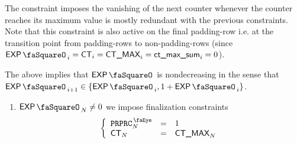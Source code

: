 \saNote{} The constraint imposes the vanishing of the next counter whenever the counter reaches its maximum value is mostly redundant with the previous constraints.
Note that this constraint is also active on the final padding-row i.e. at the transition point from padding-rows to non-padding-rows (since $\expStamp_{i} = \ct_{i} = \maxCt_{i} = \maxCtFlagSum_{i} = 0$).

\saNote{} The above implies that $\expStamp$ is nondecreasing in the sense that $\expStamp_{i + 1} \in \{ \expStamp_{i}, 1 + \expStamp_{i} \}$.
\begin{enumerate}[resume]
	\item \If $\expStamp_{N} \neq 0$ \Then we impose finalization constraints
		\[
			\left\{ \begin{array}{lcl}
				\isPreprocessing _{N} & = & 1           \\
				\ct              _{N} & = & \maxCt _{N} \\
			\end{array} \right.
		\]
\end{enumerate}
